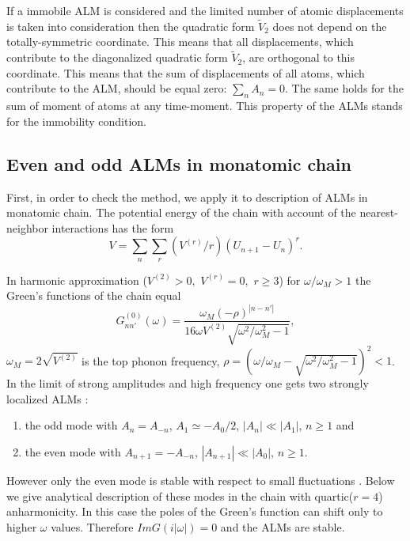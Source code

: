If a immobile ALM is considered and  the limited number of atomic
displacements is taken into consideration
then the quadratic form
$\tilde{V}_2$ does not  depend on the totally-symmetric coordinate. 
This means that all displacements, which contribute to the diagonalized 
quadratic form
$\tilde{V}_2$, are orthogonal to this coordinate. This means that
the sum of displacements of all atoms, which contribute to the ALM,
should be equal zero: $\sum_n A_n = 0$. The same holds for the sum of 
moment of atoms at any time-moment. This property of the ALMs stands for the
immobility condition.  

\subsection{Even and odd ALMs in monatomic chain} 
First, in order to check the method, we apply it to description of
ALMs in monatomic chain. The potential 
energy of the chain with account of the nearest-neighbor interactions has the 
form 
$$ 
V=\sum_n \sum_r (V^{(r)}/r) (U_{n+1} -U_n)^r. 
$$ 

In harmonic approximation ($V^{(2)}>0,\,\, V^{(r)}=0,\,\, r\geq 3$) for 
$\omega/\omega_M > 1$ the Green's functions of the chain equal \cite{economou}
$$
G^{(0)}_{nn'}(\omega) = \frac{\omega_M (-\rho)^{|n-n'|}}
{16 \omega V^{(2)} \sqrt{\omega^2 /\omega_M^2 -1}},
$$ 
$\omega_M = 2\sqrt{V^{(2)}}$ is the top phonon frequency,
$\rho = (\omega/\omega_M - \sqrt{\omega^2/\omega_M^2-1})^2 < 1$.
In the limit of strong amplitudes and high frequency one gets two strongly 
localized  ALMs \cite{sivtak,page}: 
\begin{enumerate}
\item the odd mode with $A_n= A_{-n}$,  
$A_1 \simeq -A_0/2$, $|A_n|\ll |A_1|$, $n \ge 1$ and 
\item the even mode with 
$A_{n+1} = -A_{-n}$, $|A_{n+1}| \ll |A_0|$, $n \ge 1$. 
\end{enumerate}
However only the even mode is stable with respect to small
fluctuations \cite{kissievers}.
Below we give analytical description of these modes
in the chain with quartic($r=4$) anharmonicity.
In this case the poles of the Green's function can shift only to higher
$\omega$ values. Therefore $Im G(i |\omega|) = 0$ and the ALMs are stable.

